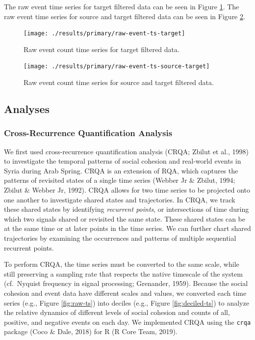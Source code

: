 \documentclass[
  english,
  man]{apa6}
\begin{document}
The raw event time series for target filtered data can be seen in Figure
\ref{fig:raw-event-ts-target}. The raw event time series for source and target
filtered data can be seen in Figure \ref{fig:raw-event-ts-source-target}.

\begin{figure}
\texttt{[image: ./results/primary/raw-event-ts-target]} \caption{Raw event count time series for target filtered data.}\label{fig:raw-event-ts-target}
\end{figure}

\begin{figure}
\texttt{[image: ./results/primary/raw-event-ts-source-target]} \caption{Raw event count time series for source and target filtered data.}\label{fig:raw-event-ts-source-target}
\end{figure}

\hypertarget{analyses}{%
\subsection{Analyses}\label{analyses}}

\hypertarget{cross-recurrence-quantification-analysis}{%
\subsubsection{Cross-Recurrence Quantification Analysis}\label{cross-recurrence-quantification-analysis}}

We first used cross-recurrence quantification analysis (CRQA; Zbilut et al., 1998) to investigate the temporal patterns of social cohesion
and real-world events in Syria during Arab Spring. CRQA is an extension of RQA,
which captures the patterns of revisited states of a single time series
(Webber Jr \& Zbilut, 1994; Zbilut \& Webber Jr, 1992). CRQA allows for two time series
to be projected onto one another to investigate shared states and trajectories.
In CRQA, we track these shared states by identifying \emph{recurrent points}, or
intersections of time during which two signals shared or revisited the same
state. These shared states can be at the same time or at later points in the
time series. We can further chart shared trajectories by examining the
occurrences and patterns of multiple sequential recurrent points.

To perform CRQA, the time series must be converted to the same scale, while
still preserving a sampling rate that respects the native timescale of the
system (cf.~Nyquist frequency in signal processing; Grenander, 1959).
Because the social cohesion and event data have different scales and values, we
converted each time series (e.g., Figure \ref{fig:raw-ts}) into deciles (e.g.,
Figure \ref{fig:deciled-ts}) to analyze the relative dynamics of different
levels of social cohesion and counts of all, positive, and negative events on
each day. We implemented CRQA using the \texttt{crqa} package (Coco \& Dale, 2018) for R
(R Core Team, 2019).
\end{document}
